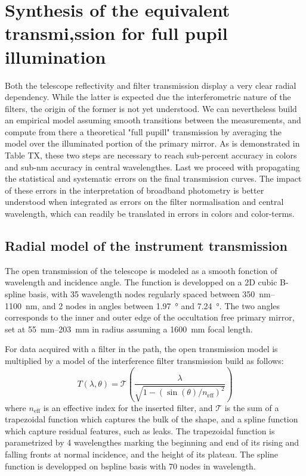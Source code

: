 \section{Synthesis of the equivalent transmi,ssion for full pupil illumination}
\label{sec:discussion}

Both the telescope reflectivity and filter transmission display a very
clear radial dependency. While the latter is expected due the
interferometric nature of the filters, the origin of the former is not
yet understood. We can nevertheless build an empirical model assuming
smooth transitions between the measurements, and compute from there a
theoretical "full pupill" transmission by averaging the model over the
illuminated portion of the primary mirror. As is demonstrated in Table
TX, these two steps are necessary to reach sub-percent accuracy in
colors and sub-nm accuracy in central wavelengthes. Last we proceed
with propagating the statistical and systematic errors on the final
transmission curves. The impact of these errors in the interpretation
of broadband photometry is better understood when integrated as errors
on the filter normalisation and central wavelength, which can readily
be translated in errors in colors and color-terms.


\subsection{Radial model of the instrument transmission}
\label{sec:model}

The open transmission of the telescope is modeled as a smooth fonction
of wavelength and incidence angle. The function is developped on a 2D
cubic B-spline basis, with \num{35} wavelength nodes regularly
spaced between \SIrange{350}{1100}{nm}, and 2 nodes in angles between
\SI{1.97}{\degree} and \SI{7.24}{\degree}. The two angles corresponds
to the inner and outer edge of the occultation free primary mirror,
set at \SIrange{55}{203}{mm} in radius assuming a \SI{1600}{mm} focal
length.

For data acquired with a filter in the path, the open transmission
model is multiplied by a model of the interference filter transmission
build as follows:
\begin{equation}
  \label{eq:filtertransmission}
T(\lambda, \theta) = \mathcal T\left(\frac{\lambda}{\sqrt{1 -
    (\sin(\theta) / n_\text{eff})^2}}\right)
\end{equation}
where $n_\text{eff}$ is an effective index for the inserted filter,
and $\mathcal T$ is the sum of a trapezoidal function which captures
the bulk of the shape, and a spline function which capture residual
features, such as leaks. The trapezoidal function is parametrized by 4
wavelengthes marking the beginning and end of its rising and falling
fronts at normal incidence, and the height of its plateau. The spline
function is developped on bspline basis with 70 nodes in wavelength.

